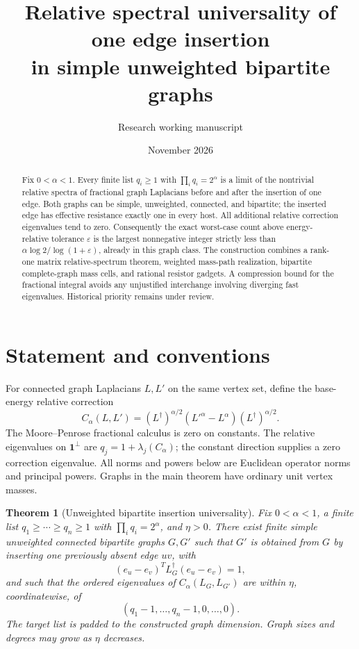 \documentclass[11pt]{article}
\title{Relative spectral universality of one edge insertion\protect\\
in simple unweighted bipartite graphs}
\author{Research working manuscript}
\date{November 2026}
\newtheorem{theorem}{Theorem}[section]
\begin{document}
\maketitle
\begin{abstract}
Fix $0<\alpha<1$. Every finite list $q_i\ge1$ with
$\prod_iq_i=2^\alpha$ is a limit of the nontrivial relative spectra of
fractional graph Laplacians before and after the insertion of one edge.
Both graphs can be simple, unweighted, connected, and bipartite; the
inserted edge has effective resistance exactly one in every host.
All additional relative correction eigenvalues tend to zero.
Consequently the exact worst-case count above energy-relative tolerance
$\varepsilon$ is the largest nonnegative integer strictly less than
$\alpha\log2/\log(1+\varepsilon)$, already in this graph class.
The construction combines a rank-one matrix relative-spectrum theorem,
weighted mass-path realization, bipartite complete-graph mass cells,
and rational resistor gadgets. A compression bound for the fractional
integral avoids any unjustified interchange involving diverging fast
eigenvalues. Historical priority remains under review.
\end{abstract}

\section{Statement and conventions}
For connected graph Laplacians $L,L'$ on the same vertex set, define
the base-energy relative correction
\[
 C_\alpha(L,L')
  =(L^\dagger)^{\alpha/2}(L'^\alpha-L^\alpha)(L^\dagger)^{\alpha/2}.
\]
The Moore--Penrose fractional calculus is zero on constants. The relative
eigenvalues on $\mathbf1^\perp$ are $q_j=1+\lambda_j(C_\alpha)$;
the constant direction supplies a zero correction eigenvalue.
All norms and powers below are Euclidean operator norms and principal
powers. Graphs in the main theorem have ordinary unit vertex masses.

\begin{theorem}[Unweighted bipartite insertion universality]
\label{thm:insertion}
Fix $0<\alpha<1$, a finite list $q_1\ge\cdots\ge q_n\ge1$
with $\prod_iq_i=2^\alpha$, and $\eta>0$.
There exist finite simple unweighted connected bipartite graphs $G,G'$
such that $G'$ is obtained from $G$ by inserting one previously absent
edge $uv$, with
\[
 (e_u-e_v)^T L_G^\dagger(e_u-e_v)=1,
\]
and such that the ordered eigenvalues of $C_\alpha(L_G,L_{G'})$ are
within $\eta$, coordinatewise, of
\[
 (q_1-1,\ldots,q_n-1,0,\ldots,0).
\]
The target list is padded to the constructed graph dimension.
Graph sizes and degrees may grow as $\eta$ decreases.
\end{theorem}
\end{document}
